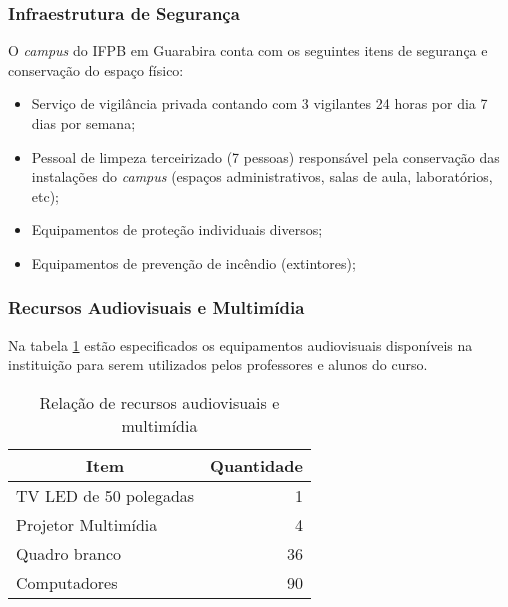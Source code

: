 \subsubsection{Infraestrutura de Segurança}

O \textit{campus} do IFPB em Guarabira conta com os seguintes itens de segurança e conservação do espaço físico:

\begin{itemize}
\item Serviço de vigilância privada contando com 3 vigilantes 24 horas por dia 7 dias por semana;
\item Pessoal de limpeza terceirizado (7 pessoas) responsável pela conservação das instalações do \textit{campus} (espaços administrativos, salas de aula, laboratórios, etc);
\item Equipamentos de proteção individuais diversos;
\item Equipamentos de prevenção de incêndio (extintores);
\end{itemize} 

\subsubsection{Recursos Audiovisuais e Multimídia}

Na tabela \ref{table:audiovisual} estão especificados os equipamentos audiovisuais disponíveis na instituição para serem utilizados pelos professores e alunos do curso.

\begin{table}[h]
\caption{Relação de recursos audiovisuais e multimídia}
\begin{center}
\begin{tabular}{|p{12cm}|r|}
\hline
\multicolumn{1}{|c|}{\textbf{Item}} & \multicolumn{1}{c|}{\textbf{Quantidade}} \\ \hline
TV  LED de 50 polegadas             & 1                                        \\ \hline
Projetor Multimídia                 & 4                                        \\ \hline
Quadro branco                       & 36                                       \\ \hline
Computadores                        & 90                                       \\ \hline
\end{tabular}
\end{center}
\label{table:audiovisual}
\end{table}

